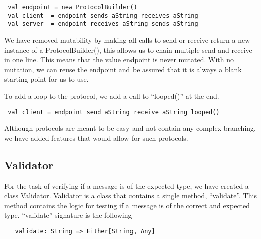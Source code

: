 \begin{lstlisting}
 val endpoint = new ProtocolBuilder()
 val client  = endpoint sends aString receives aString
 val server  = endpoint receives aString sends aString
\end{lstlisting}
We have removed mutability by making all calls to send or receive return a new instance of a ProtocolBuilder(), this allows us to chain multiple send and receive in one line. This means that the value endpoint is never mutated. With no mutation, we can reuse the endpoint and be assured that it is always a blank starting point for us to use.

To add a loop to the protocol, we add a call to ``looped()'' at the end.
\begin{lstlisting}
 val client = endpoint send aString receive aString looped()
\end{lstlisting}

Although protocols are meant to be easy and not contain any complex branching, we have added features that would allow for such protocols. 

\subsection{Validator}
\label{sec:validator}
For the task of verifying if a message is of the expected type, we have created a class Validator. Validator is a class that contains a single method, ``validate''. This method contains the logic for testing if a message is of the correct and expected type. ``validate'' signature is the following
\begin{lstlisting}
   validate: String => Either[String, Any]
\end{lstlisting}

